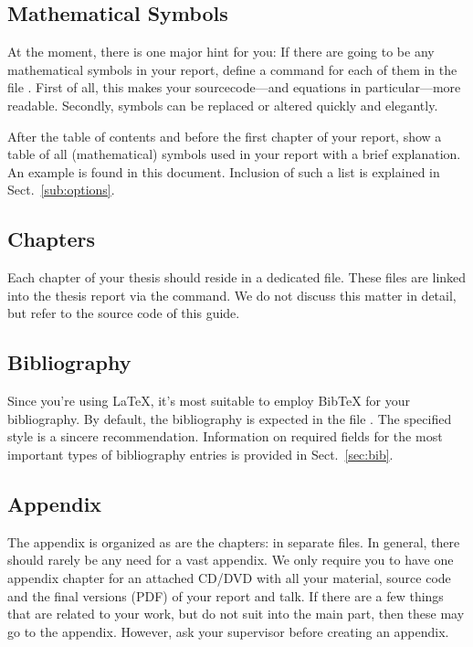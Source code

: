\subsection{Mathematical Symbols}

At the moment, there is one major hint for you: If there are going to be any mathematical symbols in your report, define a command for each of them in the file . First of all, this makes your sourcecode---and equations in particular---more readable. Secondly, symbols can be replaced or altered quickly and elegantly.

After the table of contents and before the first chapter of your report, show a table of all (mathematical) symbols used in your report with a brief explanation. An example is found in this document. Inclusion of such a list is explained in Sect.~\ref{sub:options}.


\subsection{Chapters}

Each chapter of your thesis should reside in a dedicated file. These files are linked into the thesis report via the  command. We do not discuss this matter in detail, but refer to the source code of this guide.


\subsection{Bibliography}

Since you're using \LaTeX, it's most suitable to employ BibTeX for your bibliography. By default, the bibliography is expected in the file . The specified style is a sincere recommendation. Information on required fields for the most important types of bibliography entries is provided in Sect.~\ref{sec:bib}.


\subsection{Appendix}

The appendix is organized as are the chapters: in separate files. In general, there should rarely be any need for a vast appendix. We only require you to have one appendix chapter for an attached CD/DVD with all your material, source code and the final versions (PDF) of your report and talk. If there are a few things that are related to your work, but do not suit into the main part, then these may go to the appendix. However, ask your supervisor before creating an appendix.


